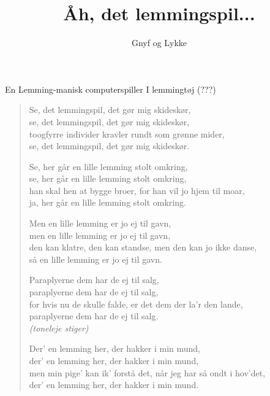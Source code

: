 \documentclass[a4paper,11pt]{article}
\title{Åh, det lemmingspil...}
\author{Gnyf og Lykke}
\begin{document}
\maketitle

\begin{roles}
 En Lemming-manisk computerspiller
 I lemmingtøj (???)
\end{roles}

\begin{verse}

Se, det lemmingspil, det gør mig skideskør,\\
se, det lemmingspil, det gør mig skideskør,\\
toogfyrre individer kravler rundt som grønne mider,\\
se, det lemmingspil, det gør mig skideskør.\\

\medskip

Se, her går en lille lemming stolt omkring,\\
se, her går en lille lemming stolt omkring,\\
han skal hen at bygge broer, for han vil jo hjem til moar,\\
ja, her går en lille lemming stolt omkring.\\

\medskip

Men en lille lemming er jo ej til gavn,\\
men en lille lemming er jo ej til gavn,\\
den kan klatre, den kan standse, men den kan jo ikke danse,\\
så en lille lemming er jo ej til gavn.\\

\medskip

Paraplyerne dem har de ej til salg,\\
paraplyerne dem har de ej til salg,\\
for hvis nu de skulle falde, er det dem der la'r den lande,\\
paraplyerne dem har de ej til salg.\\

\smallskip
{\em (toneleje stiger)}\\
\smallskip

Der' en lemming her, der hakker i min mund,\\
der' en lemming her, der hakker i min mund,\\
men min pige' kan ik' forstå det, når jeg har så ondt i hov'det,\\
der' en lemming her, der hakker i min mund.\\
 

\end{verse}
\end{document}
